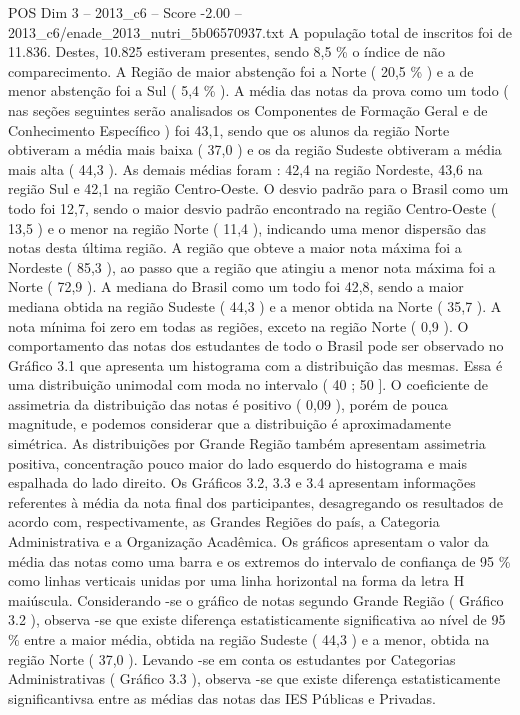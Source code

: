 \begin{textsample}{POS Dim 3 – 2013\_c6 – Score -2.00 – 2013\_c6/enade\_2013\_nutri\_5b06570937.txt}
A população total de inscritos foi de 11.836.
Destes, 10.825 estiveram presentes, sendo 8,5 \% o índice de não comparecimento.
A Região de maior abstenção foi a Norte ( 20,5 \% ) e a de menor abstenção foi a Sul ( 5,4 \% ).
A média das notas da prova como um todo ( nas seções seguintes serão analisados os Componentes de Formação Geral e de Conhecimento Específico ) foi 43,1, sendo que os alunos da região Norte obtiveram a média mais baixa ( 37,0 ) e os da região Sudeste obtiveram a média mais alta ( 44,3 ).
As demais médias foram : 42,4 na região Nordeste, 43,6 na região Sul e 42,1 na região Centro-Oeste.
O desvio padrão para o Brasil como um todo foi 12,7, sendo o maior desvio padrão encontrado na região Centro-Oeste ( 13,5 ) e o menor na região Norte ( 11,4 ), indicando uma menor dispersão das notas desta última região.
A região que obteve a maior nota máxima foi a Nordeste ( 85,3 ), ao passo que a região que atingiu a menor nota máxima foi a Norte ( 72,9 ).
A mediana do Brasil como um todo foi 42,8, sendo a maior mediana obtida na região Sudeste ( 44,3 ) e a menor obtida na Norte ( 35,7 ).
A nota mínima foi zero em todas as regiões, exceto na região Norte ( 0,9 ).
O comportamento das notas dos estudantes de todo o Brasil pode ser observado no Gráfico 3.1 que apresenta um histograma com a distribuição das mesmas.
Essa é uma distribuição unimodal com moda no intervalo ( 40 ; 50 ].
O coeficiente de assimetria da distribuição das notas é positivo ( 0,09 ), porém de pouca magnitude, e podemos considerar que a distribuição é aproximadamente simétrica.
As distribuições por Grande Região também apresentam assimetria positiva, concentração pouco maior do lado esquerdo do histograma e mais espalhada do lado direito.
Os Gráficos 3.2, 3.3 e 3.4 apresentam informações referentes à média da nota final dos participantes, desagregando os resultados de acordo com, respectivamente, as Grandes Regiões do país, a Categoria Administrativa e a Organização Acadêmica.
Os gráficos apresentam o valor da média das notas como uma barra e os extremos do intervalo de confiança de 95 \% como linhas verticais unidas por uma linha horizontal na forma da letra H maiúscula.
Considerando -se o gráfico de notas segundo Grande Região ( Gráfico 3.2 ), observa -se que existe diferença estatisticamente significativa ao nível de 95 \% entre a maior média, obtida na região Sudeste ( 44,3 ) e a menor, obtida na região Norte ( 37,0 ).
Levando -se em conta os estudantes por Categorias Administrativas ( Gráfico 3.3 ), observa -se que existe diferença estatisticamente significantivsa entre as médias das notas das IES Públicas e Privadas.

\end{textsample}
